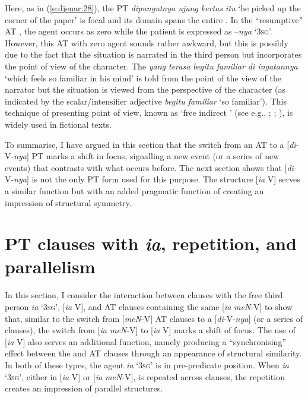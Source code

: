 \documentclass[output=paper
,modfonts
,nonflat]{langsci/langscibook}
\begin{document}
\noindent
Here, as in (\ref{e:djenar:28}), the PT  \textit{dipungutnya ujung kertas itu} ‘he picked up the corner of the paper’ is focal and its domain spans the entire . In the “resumptive” AT , the agent occurs as zero while the patient is expressed as –\textit{nya} ‘\textsc{3sg}’. However, this AT  with zero agent sounds rather awkward, but this is possibly due to the fact that the situation is narrated in the third person but incorporates the point of view of the character. The  \textit{yang terasa begitu familiar di ingatannya} ‘which feels so familiar in his mind’ is told from the point of the view of the narrator but the situation is viewed from the perspective of the character (as indicated by the scalar/intensifier adjective \textit{begitu familiar} ‘so familiar’). This technique of presenting point of view, known as ‘free indirect ’ (see e.g., \citealt{Cohn1978}; \citealt{Fludernik1993}; \citealt{Maier2014}), is widely used in fictional texts.

To summarise, I have argued in this section that the switch from an AT  to a [\textit{di}-V-\textit{nya}] PT  marks a shift in focus, signalling a new event (or a series of new events) that contrasts with what occurs before. The next section shows that [\textit{di}-V-\textit{nya}] is not the only PT form used for this purpose. The  structure [\textit{ia} V] serves a similar function but with an added pragmatic function of creating an impression of structural symmetry. 

\section{\label{s:djenar:6}PT clauses with \textit{ia}, repetition, and parallelism}

In this section, I consider the interaction between  clauses with the free third person  \textit{ia} ‘\textsc{3sg}’, [\textit{ia} V], and AT clauses containing the same  [\textit{ia} \textit{meN}-V] to show that, similar to the switch from [\textit{meN}-V] AT clauses to a [\textit{di}-V-\textit{nya}]  (or a series of clauses), the switch from [\textit{ia meN}-V] to [\textit{ia} V] marks a shift of focus. The use of [\textit{ia} V] also serves an additional function, namely producing a “synchronising” effect between the  and AT clauses through an appearance of structural similarity. In both of these  types, the agent \textit{ia} ‘\textsc{3sg}’ is in pre-predicate position. When \textit{ia} ‘\textsc{3sg}’, either in [\textit{ia} V] or [\textit{ia} \textit{meN}-V], is repeated across clauses, the repetition creates an impression of parallel structures.\largerpage
\end{document}
